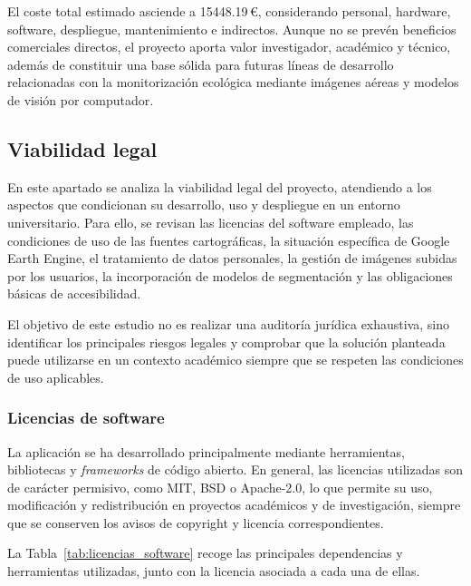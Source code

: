 El coste total estimado asciende a \num{15448.19}\,€, considerando personal, hardware, software, despliegue, mantenimiento e indirectos. Aunque no se prevén beneficios comerciales directos, el proyecto aporta valor investigador, académico y técnico, además de constituir una base sólida para futuras líneas de desarrollo relacionadas con la monitorización ecológica mediante imágenes aéreas y modelos de visión por computador.

\subsection{Viabilidad legal}

En este apartado se analiza la viabilidad legal del proyecto, atendiendo a los aspectos que condicionan su desarrollo, uso y despliegue en un entorno universitario. Para ello, se revisan las licencias del software empleado, las condiciones de uso de las fuentes cartográficas, la situación específica de Google Earth Engine, el tratamiento de datos personales, la gestión de imágenes subidas por los usuarios, la incorporación de modelos de segmentación y las obligaciones básicas de accesibilidad. 

El objetivo de este estudio no es realizar una auditoría jurídica exhaustiva, sino identificar los principales riesgos legales y comprobar que la solución planteada puede utilizarse en un contexto académico siempre que se respeten las condiciones de uso aplicables.

\subsubsection{Licencias de software}

La aplicación se ha desarrollado principalmente mediante herramientas, bibliotecas y \textit{frameworks} de código abierto. En general, las licencias utilizadas son de carácter permisivo, como MIT, BSD o Apache-2.0, lo que permite su uso, modificación y redistribución en proyectos académicos y de investigación, siempre que se conserven los avisos de copyright y licencia correspondientes.

La Tabla~\ref{tab:licencias_software} recoge las principales dependencias y herramientas utilizadas, junto con la licencia asociada a cada una de ellas.

